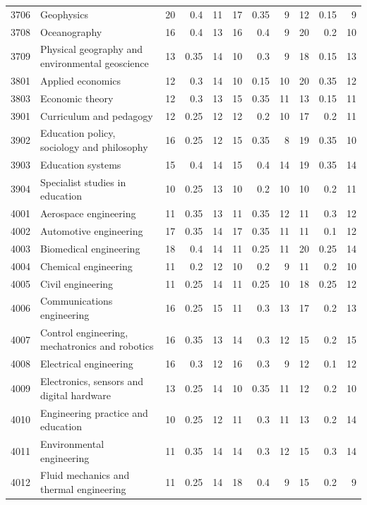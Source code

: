\begin{longtable}{r p{2.15cm} rrr rrr rrr}
3706 & Geophysics & 20 & 0.4 & 11 & 17 & 0.35 & 9 & 12 & 0.15 & 9 \\
3708 & Oceanography & 16 & 0.4 & 13 & 16 & 0.4 & 9 & 20 & 0.2 & 10 \\
3709 & Physical geography and environmental geoscience & 13 & 0.35 & 14 & 10 & 0.3 & 9 & 18 & 0.15 & 13 \\
3801 & Applied economics & 12 & 0.3 & 14 & 10 & 0.15 & 10 & 20 & 0.35 & 12 \\
3803 & Economic theory & 12 & 0.3 & 13 & 15 & 0.35 & 11 & 13 & 0.15 & 11 \\
3901 & Curriculum and pedagogy & 12 & 0.25 & 12 & 12 & 0.2 & 10 & 17 & 0.2 & 11 \\
3902 & Education policy, sociology and philosophy & 16 & 0.25 & 12 & 15 & 0.35 & 8 & 19 & 0.35 & 10 \\
3903 & Education systems & 15 & 0.4 & 14 & 15 & 0.4 & 14 & 19 & 0.35 & 14 \\
3904 & Specialist studies in education & 10 & 0.25 & 13 & 10 & 0.2 & 10 & 10 & 0.2 & 11 \\
4001 & Aerospace engineering & 11 & 0.35 & 13 & 11 & 0.35 & 12 & 11 & 0.3 & 12 \\
4002 & Automotive engineering & 17 & 0.35 & 14 & 17 & 0.35 & 11 & 11 & 0.1 & 12 \\
4003 & Biomedical engineering & 18 & 0.4 & 14 & 11 & 0.25 & 11 & 20 & 0.25 & 14 \\
4004 & Chemical engineering & 11 & 0.2 & 12 & 10 & 0.2 & 9 & 11 & 0.2 & 10 \\
4005 & Civil engineering & 11 & 0.25 & 14 & 11 & 0.25 & 10 & 18 & 0.25 & 12 \\
4006 & Communications engineering & 16 & 0.25 & 15 & 11 & 0.3 & 13 & 17 & 0.2 & 13 \\
4007 & Control engineering, mechatronics and robotics & 16 & 0.35 & 13 & 14 & 0.3 & 12 & 15 & 0.2 & 15 \\
4008 & Electrical engineering & 16 & 0.3 & 12 & 16 & 0.3 & 9 & 12 & 0.1 & 12 \\
4009 & Electronics, sensors and digital hardware & 13 & 0.25 & 14 & 10 & 0.35 & 11 & 12 & 0.2 & 10 \\
4010 & Engineering practice and education & 10 & 0.25 & 12 & 11 & 0.3 & 11 & 13 & 0.2 & 14 \\
4011 & Environmental engineering & 11 & 0.35 & 14 & 14 & 0.3 & 12 & 15 & 0.3 & 14 \\
4012 & Fluid mechanics and thermal engineering & 11 & 0.25 & 14 & 18 & 0.4 & 9 & 15 & 0.2 & 9 \\

\end{longtable}
